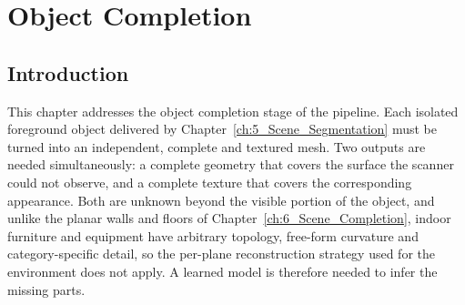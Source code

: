 \cleardoublepage
{}
\cleardoublepage

\chapter{Object Completion}
\label{ch:7_Object_Completion}



\section{Introduction}
\label{sec:7_intro}

This chapter addresses the object completion stage of the pipeline. Each isolated foreground object delivered by Chapter~\ref{ch:5_Scene_Segmentation} must be turned into an independent, complete and textured mesh. Two outputs are needed simultaneously: a complete geometry that covers the surface the scanner could not observe, and a complete texture that covers the corresponding appearance. Both are unknown beyond the visible portion of the object, and unlike the planar walls and floors of Chapter~\ref{ch:6_Scene_Completion}, indoor furniture and equipment have arbitrary topology, free-form curvature and category-specific detail, so the per-plane reconstruction strategy used for the environment does not apply. A learned model is therefore needed to infer the missing parts.

